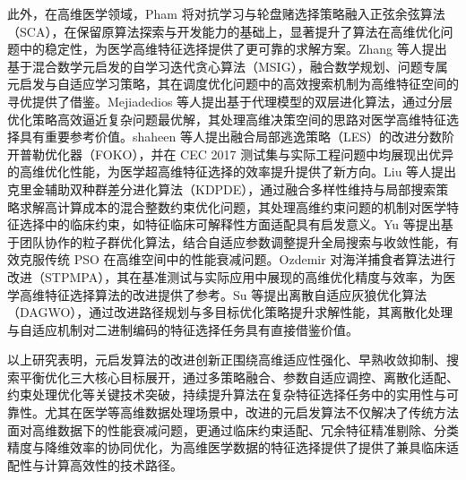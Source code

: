 \documentclass{wzuthesis}
\begin{document}
此外，在高维医学领域，Pham 将对抗学习与轮盘赌选择策略融入正弦余弦算法（SCA），在保留原算法探索与开发能力的基础上，显著提升了算法在高维优化问题中的稳定性，为医学高维特征选择提供了更可靠的求解方案。Zhang 等人提出基于混合数学元启发的自学习迭代贪心算法（MSIG），融合数学规划、问题专属元启发与自适应学习策略，其在调度优化问题中的高效搜索机制为高维特征空间的寻优提供了借鉴。Mejiadedios 等人提出基于代理模型的双层进化算法，通过分层优化策略高效逼近复杂问题最优解，其处理高维决策空间的思路对医学高维特征选择具有重要参考价值。shaheen 等人提出融合局部逃逸策略（LES）的改进分数阶开普勒优化器（FOKO），并在 CEC 2017 测试集与实际工程问题中均展现出优异的高维优化性能，为医学超高维特征选择的效率提升提供了新方向。Liu 等人提出克里金辅助双种群差分进化算法（KDPDE），通过融合多样性维持与局部搜索策略求解高计算成本的混合整数约束优化问题，其处理高维约束问题的机制对医学特征选择中的临床约束，如特征临床可解释性方面适配具有启发意义。Yu 等提出基于团队协作的粒子群优化算法，结合自适应参数调整提升全局搜索与收敛性能，有效克服传统 PSO 在高维空间中的性能衰减问题。Ozdemir 对海洋捕食者算法进行改进（STPMPA），其在基准测试与实际应用中展现的高维优化精度与效率，为医学高维特征选择算法的改进提供了参考。Su 等提出离散自适应灰狼优化算法（DAGWO），通过改进路径规划与多目标优化策略提升求解性能，其离散化处理与自适应机制对二进制编码的特征选择任务具有直接借鉴价值。

以上研究表明，元启发算法的改进创新正围绕高维适应性强化、早熟收敛抑制、搜索平衡优化三大核心目标展开，通过多策略融合、参数自适应调控、离散化适配、约束处理优化等关键技术突破，持续提升算法在复杂特征选择任务中的实用性与可靠性。尤其在医学等高维数据处理场景中，改进的元启发算法不仅解决了传统方法面对高维数据下的性能衰减问题，更通过临床约束适配、冗余特征精准剔除、分类精度与降维效率的协同优化，为高维医学数据的特征选择提供了提供了兼具临床适配性与计算高效性的技术路径。
\end{document}
